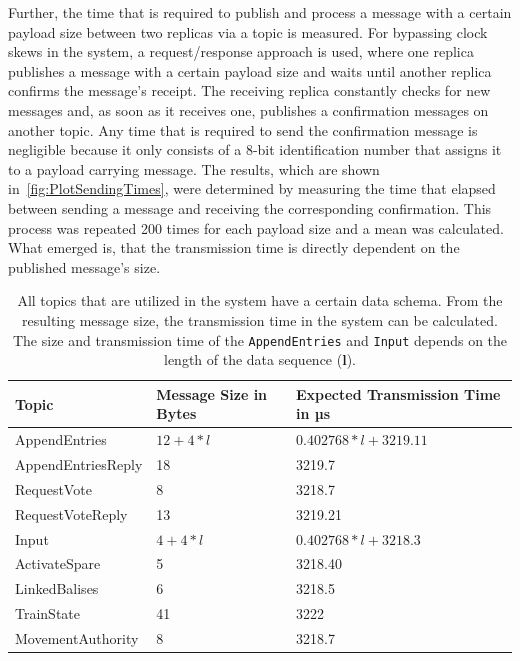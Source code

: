 Further, the time that is required to publish and process a message with a certain payload size between two replicas via a  topic is measured.
For bypassing clock skews in the system, a request/response approach is used, where one replica publishes a message with a certain payload size and waits until another replica confirms the message's receipt.
The receiving replica constantly checks for new messages and, as soon as it receives one, publishes a confirmation messages on another topic.
Any time that is required to send the confirmation message is negligible because it only consists of a 8-bit identification number that assigns it to a payload carrying message.
The results, which are shown in~\autoref{fig:PlotSendingTimes}, were determined by measuring the time that elapsed between sending a message and receiving the corresponding confirmation.
This process was repeated 200 times for each payload size and a mean was calculated.
What emerged is, that the transmission time is directly dependent on the published message's size.
\\

\begin{table}[h!]
	\begin{center}
		\caption{All topics that are utilized in the system have a certain data schema. From the resulting message size, the transmission time in the system can be calculated. The size and transmission time of the \texttt{AppendEntries} and \texttt{Input} depends on the length of the data sequence (\textbf{l}).}
		\label{tab:topicSendingTimes}
		\begin{tabularx}{\textwidth}{|X|X|X|}
			\hline
			\textbf{Topic} & \textbf{Message Size in Bytes} & \textbf{Expected Transmission Time in µs} \\
			\hline \hline
			AppendEntries & $12 + 4 * l$ & $0.402768 * l + 3219.11$ \\
			\hline
			AppendEntriesReply & 18 & 3219.7 \\
			\hline
			RequestVote & 8 & 3218.7 \\
			\hline
			RequestVoteReply & 13 & 3219.21 \\
			\hline
			Input & $4 + 4 * l$ & $0.402768 * l + 3218.3$ \\
			\hline
			ActivateSpare & 5 & 3218.40 \\
			\hline
			LinkedBalises & 6 & 3218.5 \\
			\hline
			TrainState & 41 & 3222 \\
			\hline
			MovementAuthority & 8 & 3218.7 \\
			\hline
		\end{tabularx}
	\end{center}
\end{table}

